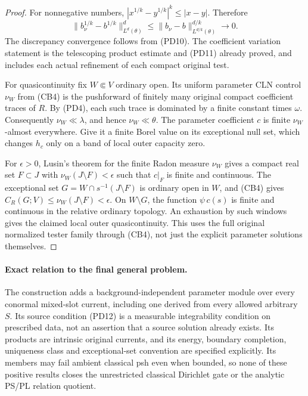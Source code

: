 \begin{proof}
For nonnegative numbers,
$|x^{1/k}-y^{1/k}|^k\leq|x-y|$. Therefore
\[
 \|b_\nu^{1/k}-b^{1/k}\|_{L^d(\theta)}^d
      \leq\|b_\nu-b\|_{L^{d/k}(\theta)}^{d/k}\longrightarrow0.
\]
The discrepancy convergence follows from (PD10).
The coefficient variation statement is the telescoping
product estimate and (PD11) already proved, and includes
each actual refinement of each compact original test.

For quasicontinuity fix $W\Subset V$ ordinary open.
Its uniform parameter CLN control $\nu_W$ from (CB4)
is the pushforward of finitely many original compact
coefficient traces of $R$. By (PD4), each such trace
is dominated by a finite constant times $\omega$.
Consequently $\nu_W\ll\lambda$, and hence
$\nu_W\ll\theta$. The parameter coefficient $c$ is
finite $\nu_W$-almost everywhere. Give it a finite
Borel value on its exceptional null set, which changes
$h_c$ only on a band of local outer capacity zero.

For $\epsilon>0$, Lusin's theorem for the finite Radon
measure $\nu_W$ gives a compact real set $F\subset J$
with $\nu_W(J\setminus F)<\epsilon$ such that
$c|_F$ is finite and continuous. The exceptional set
$G=W\cap s^{-1}(J\setminus F)$ is ordinary open in
$W$, and (CB4) gives
$C_R(G;V)\leq\nu_W(J\setminus F)<\epsilon$.
On $W\setminus G$, the function
$\psi\,c(s)$ is finite and continuous in the relative
ordinary topology. An exhaustion by such windows
gives the claimed local outer quasicontinuity.
This uses the full original normalized tester family
through (CB4), not just the explicit parameter
solutions themselves.
\end{proof}

\paragraph{Exact relation to the final general problem.}
The construction adds a background-independent parameter
module over every conormal mixed-slot current, including
one derived from every allowed arbitrary $S$. Its source
condition (PD12) is a measurable integrability condition
on prescribed data, not an assertion that a source
solution already exists. Its products are intrinsic
original currents, and its energy, boundary completion,
uniqueness class and exceptional-set convention are
specified explicitly. Its members may fail ambient
classical psh even when bounded, so none of these
positive results closes the unrestricted classical
Dirichlet gate or the analytic PS/PL relation quotient.

